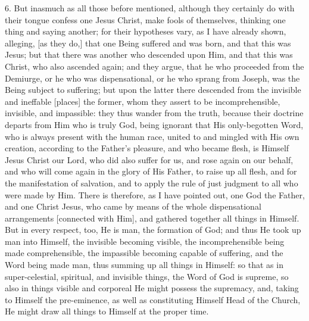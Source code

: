 \documentclass[9pt, twocolumn, oneside, a4paper]{memoir}
\newcommand{\gloss}[1]{%
    \marginpar[\RaggedLeft \footnotesize{#1}]{\RaggedRight \footnotesize{#1}}}
\begin{document}
6. But inasmuch as all those before mentioned, although they certainly do with their tongue confess one Jesus Christ, make fools of themselves, thinking one thing and saying another;  for their hypotheses vary, as I have already shown, alleging, [as they do,] that one Being suffered and was born, and that this was Jesus; but that there was another who descended upon Him, and that this was Christ, who also ascended again; and they argue, that he who proceeded from the Demiurge, or he who was dispensational, or he who sprang from Joseph, was the Being subject to suffering; but upon the latter there descended from the invisible and ineffable [places] the former, whom they assert to be incomprehensible, invisible, and impassible: they thus wander from the truth, because their doctrine departs from Him who is truly God, being ignorant that His only-begotten Word, who is always present with the human race, united to and mingled with His own creation, according to the Father's pleasure, and who became flesh, is Himself Jesus Christ our Lord, who did also suffer for us, and rose again on our behalf, and who will come again in the glory of His Father, to raise up all flesh, and for the manifestation of salvation, and to apply the rule of just judgment to all who were made by Him. There is therefore, as I have pointed out, one God the Father, and one Christ Jesus, who came by means of the whole dispensational arrangements [connected with Him], and gathered  together all things in Himself. \gloss{Ephesians 1:10} But in every respect, too, He is man, the formation of God; and thus He took up man into Himself, the invisible becoming visible, the incomprehensible being made comprehensible, the impassible becoming capable of suffering, and the Word being made man, thus summing up all things in Himself: so that as in super-celestial, spiritual, and invisible things, the Word of God is supreme, so also in things visible and corporeal He might possess the supremacy, and, taking to Himself the pre-eminence, as well as constituting Himself Head of the Church, He might draw all things to Himself at the proper time.
\end{document}
